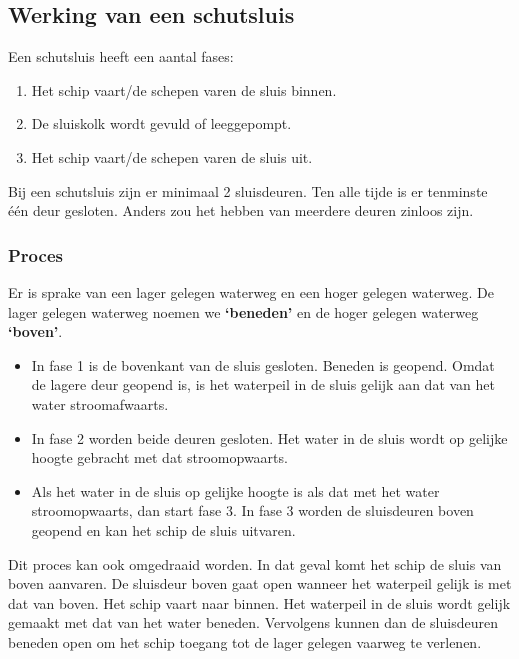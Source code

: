 \documentclass{article} %
\begin{document}
\subsection{Werking van een schutsluis}
Een schutsluis heeft een aantal fases:
\begin{enumerate}
    \item Het schip vaart/de schepen varen de sluis binnen.
    \item De sluiskolk wordt gevuld of leeggepompt.
    \item Het schip vaart/de schepen varen de sluis uit.
\end{enumerate}
Bij een schutsluis zijn er minimaal 2 sluisdeuren. Ten alle tijde is er tenminste één deur gesloten. Anders zou het hebben van meerdere deuren zinloos zijn.

\subsubsection{Proces}
Er is sprake van een lager gelegen waterweg en een hoger gelegen waterweg. De lager gelegen waterweg noemen we \textbf{‘beneden’} en de hoger gelegen waterweg \textbf{‘boven’}.

\begin{boxA}
    \begin{itemize}
        \item In fase 1 is de bovenkant van de sluis gesloten. Beneden is geopend. Omdat de lagere deur geopend is, is het waterpeil in de sluis gelijk aan dat van het water stroomafwaarts.
        \item In fase 2 worden beide deuren gesloten. Het water in de sluis wordt op gelijke hoogte gebracht met dat stroomopwaarts.
        \item Als het water in de sluis op gelijke hoogte is als dat met het water stroomopwaarts, dan start fase 3. In fase 3 worden de sluisdeuren boven geopend en kan het schip de sluis uitvaren.
    \end{itemize}
\end{boxA}

Dit proces kan ook omgedraaid worden. In dat geval komt het schip de sluis van boven aanvaren. De sluisdeur boven gaat open wanneer het waterpeil gelijk is met dat van boven. Het schip vaart naar binnen. Het waterpeil in de sluis wordt gelijk gemaakt met dat van het water beneden. Vervolgens kunnen dan de sluisdeuren beneden open om het schip toegang tot de lager gelegen vaarweg te verlenen. \par
\end{document}
